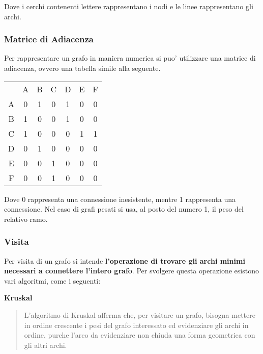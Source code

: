 \documentclass{article}
\begin{document}
{

    Dove i cerchi contenenti lettere rappresentano i nodi e le linee rappresentano gli archi.
    
    \subsubsection{Matrice di Adiacenza} %
    Per rappresentare un grafo in maniera numerica si puo' utilizzare una matrice di adiacenza, ovvero una tabella simile alla seguente.

    \begin{tabular}{ |c|c|c|c|c|c|c| }
      \hline
        & A & B & C & D & E & F \\
      A & 0 & 1 & 0 & 1 & 0 & 0 \\
      B & 1 & 0 & 0 & 1 & 0 & 0 \\
      C & 1 & 0 & 0 & 0 & 1 & 1 \\
      D & 0 & 1 & 0 & 0 & 0 & 0 \\
      E & 0 & 0 & 1 & 0 & 0 & 0 \\
      F & 0 & 0 & 1 & 0 & 0 & 0 \\
      \hline
    \end{tabular}

    Dove 0 rappresenta una connessione inesistente, mentre 1 rappresenta una connessione. Nel caso di grafi pesati si usa, al posto del numero 1, il peso del relativo ramo.

    \subsubsection{Visita} %
    Per visita di un grafo si intende \textbf{l'operazione di trovare gli archi minimi necessari a connettere l'intero grafo}. Per svolgere questa operazione esistono vari algoritmi, come i seguenti:

    \textbf{Kruskal}
    \begin{quote}
      L'algoritmo di Kruskal afferma che, per visitare un grafo, bisogna mettere in ordine crescente i pesi del grafo interessato ed evidenziare gli archi in ordine, purche l'arco da evidenziare non chiuda una forma geometrica con gli altri archi.
    
\end{quote}}
\end{document}
